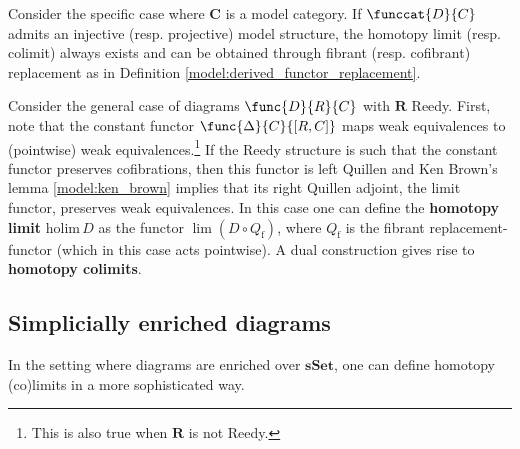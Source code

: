     \begin{property}
        Consider the specific case where $\mathbf{C}$ is a model category. If $\funccat{D}{C}$ admits an injective (resp. projective) model structure, the homotopy limit (resp. colimit) always exists and can be obtained through fibrant (resp. cofibrant) replacement as in Definition \ref{model:derived_functor_replacement}.
    \end{property}
    \begin{example}
        Consider the general case of diagrams $\func{D}{R}{C}$ with $\mathbf{R}$ Reedy. First, note that the constant functor $\func{\Delta}{C}{[R,C]}$ maps weak equivalences to (pointwise) weak equivalences.\footnote{This is also true when $\mathbf{R}$ is not Reedy.} If the Reedy structure is such that the constant functor preserves cofibrations, then this functor is left Quillen and Ken Brown's lemma \ref{model:ken_brown} implies that its right Quillen adjoint, the limit functor, preserves weak equivalences. In this case one can define the \textbf{homotopy limit} $\mathrm{holim}\,D$ as the functor $\lim(D\circ Q_\mathrm{f})$, where $Q_\mathrm{f}$ is the fibrant replacement-functor (which in this case acts pointwise). A dual construction gives rise to \textbf{homotopy colimits}.
    \end{example}

\subsection{Simplicially enriched diagrams}

    In the setting where diagrams are enriched over $\mathbf{sSet}$, one can define homotopy (co)limits in a more sophisticated way.

